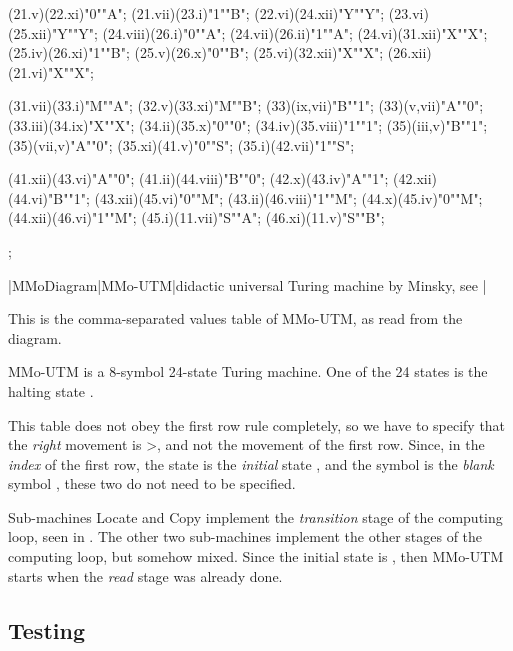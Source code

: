 \MTinput(21.v)(22.xi)"0""A";
\MTinput(21.vii)(23.i)"1""B";
\MTinput(22.vi)(24.xii)"Y""Y";
\MTinput(23.vi)(25.xii)"Y""Y";
\MTinput(24.viii)(26.i)"0""A";
\MTinput(24.vii)(26.ii)"1""A";
\MTinput(24.vi)(31.xii)"X""X";
\MTinput(25.iv)(26.xi)"1""B";
\MTinput(25.v)(26.x)"0""B";
\MTinput(25.vi)(32.xii)"X""X";
\MTinput(26.xii)(21.vi)"X""X";

\MTinput(31.vii)(33.i)"M""A";
\MTinput(32.v)(33.xi)"M""B";
\MTauto(33)(ix,vii)"B""1";
\MTauto(33)(v,vii)"A""0";
\MTinput(33.iii)(34.ix)"X""X";
\MTinput(34.ii)(35.x)"0""0";
\MTinput(34.iv)(35.viii)"1""1";
\MTauto(35)(iii,v)"B""1";
\MTauto(35)(vii,v)"A""0";
\MTinput(35.xi)(41.v)"0""S";
\MTinput(35.i)(42.vii)"1""S";

\MTinput(41.xii)(43.vi)"A""0";
\MTinput(41.ii)(44.viii)"B""0";
\MTinput(42.x)(43.iv)"A""1";
\MTinput(42.xii)(44.vi)"B""1";
\MTinput(43.xii)(45.vi)"0""M";
\MTinput(43.ii)(46.viii)"1""M";
\MTinput(44.x)(45.iv)"0""M";
\MTinput(44.xii)(46.vi)"1""M";
\MTinput(45.i)(11.vii)"S""A";
\MTinput(46.xi)(11.v)"S""B";


\MTendfig;

\dest
\centerline{|MMoDiagram|MMo-UTM|didactic universal
 Turing machine by Minsky, see |\box\MTbox}
\vfill\break

This is the comma-separated values table of MMo-UTM,
as read from the diagram.
\doublecolumns
{}
\singlecolumn

MMo-UTM is a 8-symbol 24-state Turing machine.
One of the 24 states is the halting state .

This table does not obey the first row rule completely,
so we have to specify that the {\em right} movement is \M>,
and not the movement of the first row.
Since, in the {\em index} of the first row,
the state is the {\em initial} state ,
and the symbol is the {\em blank} symbol ,
these two do not need to be specified.

Sub-machines Locate and Copy implement the {\em transition} stage
of the computing loop, seen in .
The other two sub-machines implement
the other stages of the computing loop, but somehow mixed.
Since the initial state is , then MMo-UTM starts
when the {\em read} stage was already done.

\vfil\break


\subsection{Testing}


